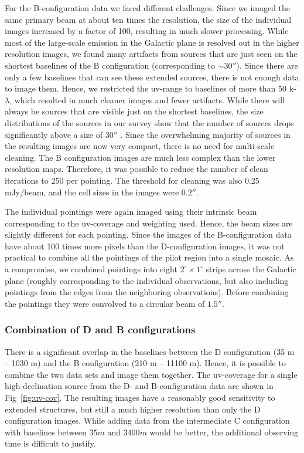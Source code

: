 \documentclass{aa}
\begin{document}
For the B-configuration data we faced different challenges. Since we imaged the same primary beam at about
ten times the resolution, the size of the individual images increased by a factor of 100, resulting in much
slower processing. While most of the large-scale emission in the Galactic plane is resolved out in the
higher resolution images, we found  many artifacts from sources that are just seen on the shortest
baselines of the B configuration (corresponding to $\sim30''$). Since there are only a few baselines that
can see  these extended sources, there is not enough data to image them. Hence, we restricted the uv-range to
baselines of more than 50 k-$\lambda$, which resulted in much cleaner images and fewer artifacts. While there
will always be sources that are visible just on the shortest baselines, the size distributions of the sources
in our survey show that the number of sources drops significantly above a size of 30$''$ \citep{Medina2019}.
Since the overwhelming majority of sources in the resulting images are now very compact, there is no need for
multi-scale cleaning. The B configuration images are much less complex than the lower resolution maps.
Therefore, it was possible to reduce the number of clean iterations to 250 per pointing. The threshold for
cleaning was also 0.25 mJy/beam, and the cell sizes in the images were $0.2''$.

The individual pointings were again imaged using their intrinsic beam corresponding to the uv-coverage and weighting
used. Hence, the beam sizes are slightly different for each pointing. Since the images of the B-configuration data
have about 100 times more pixels than the D-configuration images, it was not practical to combine all the pointings
of the pilot region into a single mosaic. As a compromise, we combined pointings into eight $2^\circ \times 1^\circ$ strips
across the Galactic plane (roughly corresponding to the individual observations, but also including pointings from the
edges from the neighboring observations). Before combining the pointings they were convolved to a  circular beam of $1.5''$.



\subsubsection{Combination of D and B configurations}

There is a significant overlap in the baselines between the D configuration (35 m -- 1030 m) and the
B configuration (210 m -- 11100 m). Hence, it is possible to combine the two data sets and image them together. The uv-coverage for a single high-declination source from the D- and B-configuration data are shown in Fig~\ref{fig:uv-cov}. The resulting images have a reasonably good sensitivity to extended structures, but still  a much higher resolution than only the D configuration images. While adding data from the intermediate C configuration with baselines between $35m$ and $3400m$ would be better, the additional observing time is difficult to justify.
\end{document}
